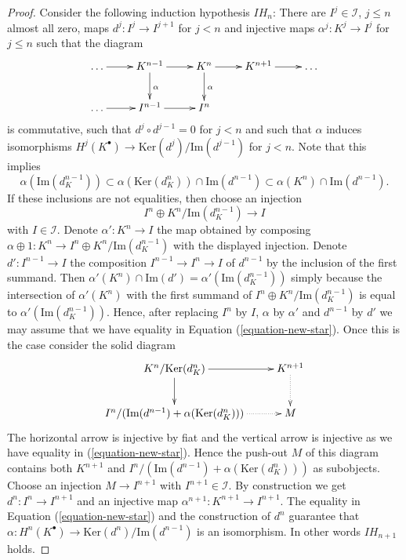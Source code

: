 \begin{proof}
Consider the following induction hypothesis $IH_n$:
There are $I^j \in \mathcal{I}$, $j \leq n$ almost
all zero, maps $d^j : I^j \to I^{j + 1}$ for $j < n$
and injective maps $\alpha^j : K^j \to I^j$ for $j \leq n$
such that the diagram
$$
\xymatrix{
\ldots \ar[r] & K^{n - 1} \ar[d]^\alpha \ar[r] &
K^n \ar[d]^\alpha \ar[r] &
K^{n + 1} \ar[r] & \ldots \\
\ldots \ar[r] & I^{n - 1} \ar[r] & I^n &  &
}
$$
is commutative, such that $d^j \circ d^{j - 1} = 0$ for $j < n$
and such that $\alpha$ induces isomorphisms
$H^j(K^\bullet) \to \text{Ker}(d^j)/\text{Im}(d^{j - 1})$
for $j < n$. Note that this implies
\begin{equation}
\label{equation-new-star}
\alpha(\text{Im}(d_K^{n - 1}))
\subset
\alpha(\text{Ker}(d_K^n)) \cap \text{Im}(d^{n - 1})
\subset
\alpha(K^n) \cap \text{Im}(d^{n - 1}).
\end{equation}
If these inclusions are not equalities, then choose an injection
$$
I^n \oplus K^n/\text{Im}(d_K^{n - 1}) \longrightarrow I
$$
with $I \in \mathcal{I}$. Denote $\alpha' : K^n \to I$ the map obtained
by composing $\alpha \oplus 1 : K^n \to I^n \oplus K^n/\text{Im}(d_K^{n - 1})$
with the displayed injection. Denote $d' : I^{n - 1} \to I$ the
composition $I^{n - 1} \to I^n \to I$ of $d^{n - 1}$ by the inclusion
of the first summand. Then
$\alpha'(K^n) \cap \text{Im}(d') = \alpha'(\text{Im}(d_K^{n - 1}))$
simply because the intersection of $\alpha'(K^n)$ with the first
summand of $I^n \oplus K^n/\text{Im}(d_K^{n - 1})$ is equal to
$\alpha'(\text{Im}(d_K^{n - 1}))$.
Hence, after replacing $I^n$ by $I$, $\alpha$ by $\alpha'$ and $d^{n - 1}$
by $d'$ we may assume that we have equality in
Equation (\ref{equation-new-star}). Once this is the
case consider the solid diagram
$$
\xymatrix{
K^n/\text{Ker}(d_K^n) \ar[r] \ar[d] & K^{n + 1} \ar@{..>}[d] \\
I^n/(\text{Im}(d^{n - 1}) + \alpha(\text{Ker}(d_K^n))) \ar@{..>}[r] & M
}
$$
The horizontal arrow is injective by fiat and the vertical arrow
is injective as we have equality in (\ref{equation-new-star}).
Hence the push-out $M$ of this diagram contains both
$K^{n + 1}$ and $I^n/(\text{Im}(d^{n - 1}) + \alpha(\text{Ker}(d_K^n)))$
as subobjects. Choose an injection $M \to I^{n + 1}$ with
$I^{n + 1} \in \mathcal{I}$. By construction we get
$d^n : I^n \to I^{n + 1}$ and an injective map
$\alpha^{n + 1} : K^{n + 1} \to I^{n + 1}$.
The equality in Equation (\ref{equation-new-star}) and the construction of
$d^n$ guarantee that $\alpha : H^n(K^\bullet) \to
\text{Ker}(d^n)/\text{Im}(d^{n - 1})$ is an isomorphism.
In other words $IH_{n + 1}$ holds.


\end{proof}

